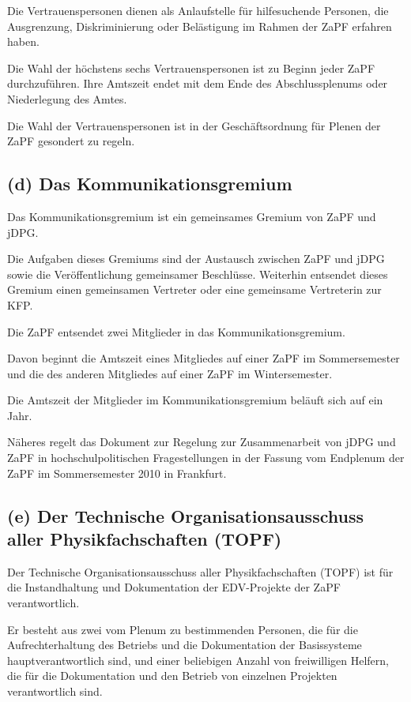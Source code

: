 \documentclass[12pt,oneside]{scrartcl}
\begin{document}
Die Vertrauenspersonen dienen als Anlaufstelle für hilfesuchende Personen, die
Ausgrenzung, Diskriminierung oder Belästigung im Rahmen der ZaPF erfahren haben.

Die Wahl der höchstens sechs Vertrauenspersonen ist zu Beginn jeder ZaPF durchzuführen.
Ihre Amtszeit endet mit dem Ende des Abschlussplenums oder Niederlegung des Amtes.

Die Wahl der Vertrauenspersonen ist in der Geschäftsordnung für Plenen der ZaPF
gesondert zu regeln.


\subsection{(d) Das Kommunikationsgremium%
  \label{d-das-kommunikationsgremium}%
}

Das Kommunikationsgremium ist ein gemeinsames Gremium von ZaPF und jDPG.

Die Aufgaben dieses Gremiums sind der Austausch zwischen ZaPF und jDPG sowie
die Veröffentlichung gemeinsamer Beschlüsse.
Weiterhin entsendet dieses Gremium einen gemeinsamen Vertreter oder eine
gemeinsame Vertreterin zur KFP.

Die ZaPF entsendet zwei Mitglieder in das Kommunikationsgremium.

Davon beginnt die Amtszeit eines Mitgliedes auf einer ZaPF im Sommersemester und
die des anderen Mitgliedes auf einer ZaPF im Wintersemester.

Die Amtszeit der Mitglieder im Kommunikationsgremium beläuft sich auf ein Jahr.

Näheres regelt das Dokument zur \textquotedbl{}Regelung zur Zusammenarbeit von jDPG und ZaPF
in hochschulpolitischen Fragestellungen\textquotedbl{} in der Fassung vom Endplenum der ZaPF
im Sommersemester 2010 in Frankfurt.


\subsection{(e) Der Technische Organisationsausschuss aller Physikfachschaften (TOPF)%
  \label{e-der-technische-organisationsausschuss-aller-physikfachschaften-topf}%
}

Der Technische Organisationsausschuss aller Physikfachschaften (TOPF) ist für
die Instandhaltung und Dokumentation der EDV-Projekte der ZaPF verantwortlich.

Er besteht aus zwei vom Plenum zu bestimmenden Personen, die für die
Aufrechterhaltung des Betriebs und die Dokumentation der Basissysteme
hauptverantwortlich sind, und einer beliebigen Anzahl von freiwilligen Helfern,
die für die Dokumentation und den Betrieb von einzelnen Projekten verantwortlich
sind.
\end{document}
